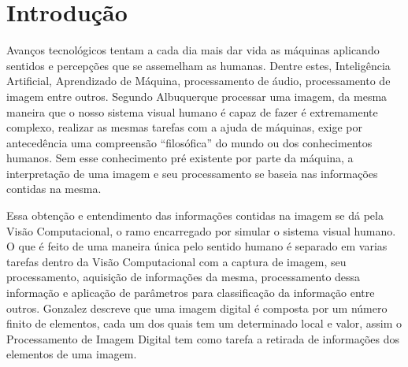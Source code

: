 
\chapter{Introdução} \label{Cap:Introducao}
Avanços tecnológicos tentam a cada dia mais dar vida as máquinas aplicando sentidos e percepções que se assemelham as humanas. Dentre estes, Inteligência Artificial, Aprendizado de Máquina, processamento de áudio, processamento de imagem entre outros. Segundo Albuquerque\cite{Albuquerque:2001} processar uma imagem, da mesma maneira que o nosso sistema visual humano é capaz de fazer é extremamente complexo, realizar as mesmas tarefas com a ajuda de máquinas, exige por antecedência uma compreensão “filosófica” do mundo ou dos conhecimentos humanos. Sem esse conhecimento pré existente por parte da máquina, a interpretação de uma imagem e seu processamento se baseia nas informações contidas na mesma.
	
	 Essa obtenção e entendimento das informações contidas na imagem se dá pela Visão Computacional, o ramo encarregado por simular o sistema visual humano. O que é feito de uma maneira única pelo sentido humano é separado em varias tarefas dentro da Visão Computacional com a captura de imagem, seu processamento, aquisição de informações da mesma, processamento dessa informação e aplicação de parâmetros para classificação da informação entre outros. Gonzalez\cite{Gonzalez:2008} descreve que uma imagem digital é composta por um número finito de elementos, cada um dos quais tem um determinado local e valor, assim o Processamento de Imagem Digital tem como tarefa a retirada de informações dos elementos de uma imagem.
	
